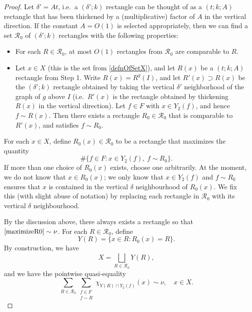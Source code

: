 \documentclass[letterpaper, reqno,11pt]{article}
\numberwithin{equation}{section}
\numberwithin{thm}{section}
\theoremstyle{remark}
\begin{document}
\begin{proof}
Let $\delta'=At$, i.e.~a $(\delta';k)$ rectangle can be thought of as a $(t;k;A)$ rectangle that has been thickened by a (multiplicative) factor of $A$ in the vertical direction. If the constant $A = O(1)$ is selected appropriately, then we can find a set $\mathcal{R}_0$ of $(\delta';k)$ rectangles with the following properties: 
\begin{itemize}
	\item[(i)] For each $R\in\mathcal{R}_0$, at most $O(1)$ rectangles from $\mathcal{R}_0$ are comparable to $R$. 
	\item[(ii)] Let $x\in X$ (this is the set from \eqref{defnOfSetX}), and let $R(x)$ be a $(t;k;A)$ rectangle from Step 1. Write $R(x) = R^g(I)$, and let $R'(x)\supset R(x)$ be the $(\delta';k)$ rectangle obtained by taking the vertical $\delta'$ neighborhood of the graph of $g$ above $I$ (i.e.~$R'(x)$ is the rectangle obtained by thickening $R(x)$ in the vertical direction). Let $f\in F$ with $x\in Y_2(f)$, and hence $f\sim R(x)$. Then there exists a rectangle $R_0\in \mathcal{R}_0$ that is comparable to $R'(x)$, and satisfies $f\sim R_0$. 
\end{itemize}

For each $x\in X$, define $R_0(x)\in\mathcal{R}_0$ to be a rectangle that maximizes the quantity
\begin{equation}\label{maximizeR0}
\#\{f\in F\colon x\in Y_2(f),\ f\sim R_0\}.
\end{equation}
If more than one choice of $R_0(x)$ exists, choose one arbitrarily. At the moment, we do not know that $x\in R_0(x)$; we only know that $x\in Y_2(f)$ and $f\sim R_0$ ensures that $x$ is contained in the vertical $\delta$ neighbourhood of $R_0(x)$. We fix this (with slight abuse of notation) by replacing each rectangle in $\mathcal{R}_0$ with its vertical $\delta$ neighbourhood.

By the discussion above, there always exists a rectangle so that $\eqref{maximizeR0}\sim \nu$. For each $R\in\mathcal{R}_0$, define
\[
Y(R) = \{x\in R\colon R_0(x)=R\}.
\]
By construction, we have 
\begin{equation}\label{XPartition}
X = \bigsqcup_{R\in\mathcal{R}_0}Y(R),
\end{equation}
and we have the pointwise quasi-equality
\begin{equation}\label{quasiEqualityNu}
\sum_{R\in\mathcal{R}_0}\sum_{\substack{f\in F \\ f\sim R}}\chi_{Y(R)\cap Y_2(f)}(x) \sim \nu,\quad x\in X.
\end{equation}


\end{proof}
\end{document}
